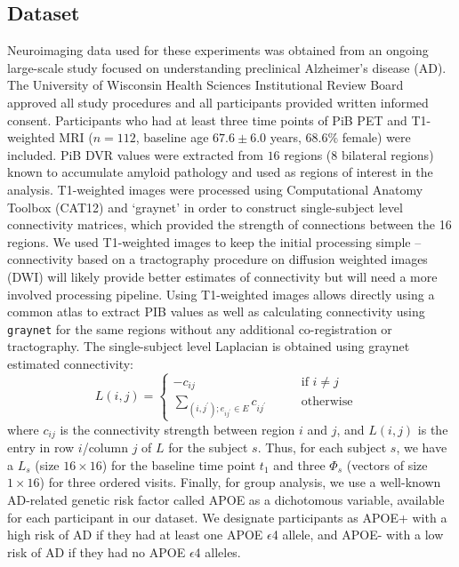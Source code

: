 \documentclass{article}
\begin{document}
\subsection{Dataset}
\label{ssec:dataset}
Neuroimaging data used for these experiments was obtained
from an ongoing large-scale study focused on understanding preclinical Alzheimer's disease (AD). The University of Wisconsin
Health Sciences Institutional Review Board approved all study procedures and all participants provided written informed consent.
Participants who had at least three time points of PiB PET and T1-weighted MRI ($n = 112$, baseline age $67.6 \pm 6.0$ years, $68.6\%$ female)
were included. PiB DVR values were extracted from $16$ regions ($8$ bilateral regions) known to accumulate amyloid pathology \cite{johnson2014amyloid}
and used as regions of interest in the analysis. T1-weighted images were processed using Computational Anatomy Toolbox (CAT12) and `graynet' \cite{raamana2015thickness} 
in order to construct single-subject level connectivity matrices, which provided the strength of connections between the 16 regions.
We used T1-weighted images to keep the initial processing simple -- 
connectivity based on a tractography procedure on diffusion weighted images (DWI) will likely provide better
estimates of connectivity but will need a more involved processing pipeline. 
Using T1-weighted images allows directly using a common atlas to extract PIB values as well as
calculating connectivity using {\tt graynet} for the same regions without any additional co-registration or tractography.
The single-subject level Laplacian is obtained using graynet estimated connectivity:
\begin{equation}
\label{eqn:eq6}
L(i,j) = \left\{
\begin{aligned}
-c_{ij} \qquad & \textrm{if  $i \neq j$}&\\ 
 \sum_{(i,j^\prime); e_{ij^\prime} \in E} c_{ij^\prime} \qquad&  \textrm{otherwise}
\end{aligned}
\right.
\end{equation}
where $c_{ij}$ is the connectivity strength between region $i$ and $j$, and $L(i,j)$ is the entry in row $i$/column $j$ of $L$ for the subject $s$.
Thus, for each subject $s$, we have a $L_s$ (size $16\times16$) for
the baseline time point $t_1$ and three $\Phi_s$ (vectors of size $1\times16$) for three ordered visits. Finally, for group analysis, we use
a well-known AD-related genetic risk factor called APOE \cite{rebeck1993apolipoprotein} as a dichotomous variable, available for 
each
participant in our dataset. We designate participants as APOE+ with a high risk of AD
if they had at least one APOE $\epsilon$4 allele, and APOE- with a low risk of AD if they had no APOE $\epsilon$4 alleles.
\end{document}
